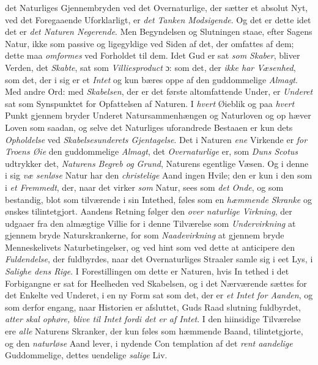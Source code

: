det Naturliges Gjennembryden ved det Overnaturlige, der
sætter et absolut Nyt, ved det Foregaaende Uforklarligt, er
\emph{det Tanken Modsigende}. Og det er dette idet det er
\emph{det Naturen Negerende}. Men Begyndelsen og Slutningen
staae, efter Sagens Natur, ikke som passive og ligegyldige ved
Siden af det, der omfattes af dem; dette maa \emph{omformes}
ved Forholdet til dem. Idet Gud er sat \emph{som Skaber}, bliver
Verden, det \emph{Skabte}, sat som \emph{Villiesproduct} ɔ: som det,
der \emph{ikke har Væsenhed}, som det, der i sig er et \emph{Intet}
og kun bæres oppe af den guddommelige \emph{Almagt}. Med
andre Ord: med \emph{Skabelsen}, der er det første altomfattende
Under, er \emph{Underet} sat som Synspunktet for Opfattelsen af
Naturen. I \emph{hvert} Øieblik og paa \emph{hvert} Punkt gjennem\-%
bryder Underet Natursammenhængen og Naturloven og op\-%
hæver Loven som saadan, og selve det Naturliges uforandrede
Bestaaen er kun dets \emph{Opholdelse} ved \emph{Skabelsesunderets
Gjentagelse}. Det i Naturen \emph{ene} Virkende er \emph{for Troens
Øie} den guddommelige \emph{Almagt}, det \emph{Overnaturlige} er,
som \emph{Duns Scotus} udtrykker det, \emph{Naturens Begreb og
Grund}, Naturens egentlige Væsen. Og i denne i sig \emph{væ\-%
senløse} Natur har den \emph{christelige} Aand ingen Hvile; den
er kun i den som i \emph{et Fremmedt}, der, naar det virker
\emph{som} Natur, sees som \emph{det Onde}, og som bestandig, blot som
tilværende i sin Intethed, føles som en \emph{hæmmende Skranke}
og ønskes tilintetgjort. Aandens Retning følger den \emph{over\-%
naturlige Virkning}, der udgaaer fra den almægtige Villie
for i denne Tilværelse som \emph{Undervirkning} at gjennem\-%
bryde Naturskrankerne, for som \emph{Naadevirkning} at gjennem\-%
bryde Menneskelivets Naturbetingelser, og ved hint som ved
dette at anticipere den \emph{Fuldendelse}, der fuldbyrdes, naar
det Overnaturliges Straaler samle sig i eet Lys, i \emph{Salighe\-%
dens Rige}. I Forestillingen om dette er Naturen, hvis In\-%
tethed i det Forbigangne er sat for Heelheden ved Skabelsen,
og i det Nærværende sættes for det Enkelte ved Underet, i
en ny Form sat som det, der er \emph{et Intet for Aanden}, og
som derfor engang, naar Historien er afsluttet, Guds Raad\-%
slutning fuldbyrdet, \emph{atter skal ophøre, blive til Intet
fordi det er af Intet}. I den hiinsidige Tilværelse ere \emph{alle}
Naturens Skranker, der kun føles som hæmmende Baand,
tilintetgjorte, og den \emph{naturløse} Aand lever, i nydende Con\-%
templation af det \emph{rent aandelige} Guddommelige, dettes
uendelige \emph{salige} Liv.

